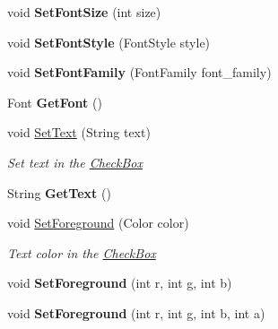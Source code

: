 \begin{DoxyCompactItemize}
\mbox{\label{class_space_v_i_l_1_1_check_box_a9ae10dde1bb359307ad7727b05fdc030}} 
void {\bfseries Set\+Font\+Size} (int size)
\item 
\mbox{\label{class_space_v_i_l_1_1_check_box_a69064f3d0c1c9d2e68af5a6be73c345b}} 
void {\bfseries Set\+Font\+Style} (Font\+Style style)
\item 
\mbox{\label{class_space_v_i_l_1_1_check_box_a74f1891bdb741132333eaf36913b22e6}} 
void {\bfseries Set\+Font\+Family} (Font\+Family font\+\_\+family)
\item 
\mbox{\label{class_space_v_i_l_1_1_check_box_a98ad43be7d9e38379f9d7b78778d4098}} 
Font {\bfseries Get\+Font} ()
\item 
void \mbox{\hyperlink{class_space_v_i_l_1_1_check_box_aa6659e84a3b86101b8af3396fefbe01d}{Set\+Text}} (String text)
\begin{DoxyCompactList}\small\item\em Set text in the \mbox{\hyperlink{class_space_v_i_l_1_1_check_box}{Check\+Box}} \end{DoxyCompactList}\item 
\mbox{\label{class_space_v_i_l_1_1_check_box_aa27cad2052e6b7d00ff27482c83cafb3}} 
String {\bfseries Get\+Text} ()
\item 
void \mbox{\hyperlink{class_space_v_i_l_1_1_check_box_a67374114323c8079e8c8cf70738556f9}{Set\+Foreground}} (Color color)
\begin{DoxyCompactList}\small\item\em Text color in the \mbox{\hyperlink{class_space_v_i_l_1_1_check_box}{Check\+Box}} \end{DoxyCompactList}\item 
\mbox{\label{class_space_v_i_l_1_1_check_box_a1d10702d2d3df661a432d107514bbfb2}} 
void {\bfseries Set\+Foreground} (int r, int g, int b)
\item 
\mbox{\label{class_space_v_i_l_1_1_check_box_a9bcf57a7a51524b537b2c1e0bcb3a6c1}} 
void {\bfseries Set\+Foreground} (int r, int g, int b, int a)

\end{DoxyCompactItemize}
